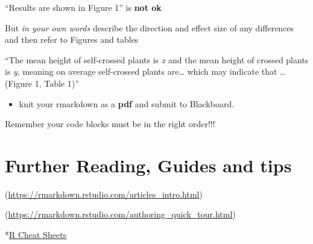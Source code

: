 \documentclass[
]{book}
\makeatletter
\providecommand{\tightlist}{%
  \setlength{\itemsep}{0pt}\setlength{\parskip}{0pt}}
\newenvironment{kframe}{%
\medskip{}
\setlength{\fboxsep}{.8em}
 \def\at@end@of@kframe{}%
 \ifinner\ifhmode%
  \def\at@end@of@kframe{\end{minipage}}%
  \begin{minipage}{\columnwidth}%
 \fi\fi%
 \def\FrameCommand##1{\hskip\@totalleftmargin \hskip-\fboxsep
 \colorbox{shadecolor}{##1}\hskip-\fboxsep
     \hskip-\linewidth \hskip-\@totalleftmargin \hskip\columnwidth}%
 \MakeFramed {\advance\hsize-\width
   \@totalleftmargin\z@ \linewidth\hsize
   \@setminipage}}%
 {\par\unskip\endMakeFramed%
 \at@end@of@kframe}
\newenvironment{block}[1]
  {
  \begin{itemize}
  \renewcommand{\labelitemi}{
    \raisebox{-.7\height}[0pt][0pt]{
      {\setkeys{Gin}{width=3em,keepaspectratio}\texttt{[image: images/\#1]}}
    }
  }
  \setlength{\fboxsep}{1em}
  \begin{kframe}
  \item
  }
  {
  \end{kframe}
  \end{itemize}
  }
\newenvironment{rmdtip}
  {\begin{block}{tip}}
  {\end{block}}
\makeatother
\begin{document}
``Results are shown in Figure 1'' is \textbf{not ok}

But \emph{in your own words} describe the direction and effect size of any differences and then refer to Figures and tables

``The mean height of self-crossed plants is \emph{x} and the mean height of crossed plants is \emph{y}, meaning on average self-crossed plants are\ldots{} which may indicate that \ldots{} (Figure 1, Table 1)''

\begin{itemize}
\tightlist
\item
  knit your rmarkdown as a \textbf{pdf} and submit to Blackboard.
\end{itemize}

\begin{rmdtip}
Remember your code blocks must be in the right order!!!
\end{rmdtip}

\hypertarget{further-reading-guides-and-tips-1}{%
\section{Further Reading, Guides and tips}\label{further-reading-guides-and-tips-1}}

\citet{xie2015}

(\url{https://rmarkdown.rstudio.com/articles_intro.html})

(\url{https://rmarkdown.rstudio.com/authoring_quick_tour.html})

*\href{https://www.rstudio.com/resources/cheatsheets/}{R Cheat Sheets}

  
\end{document}
